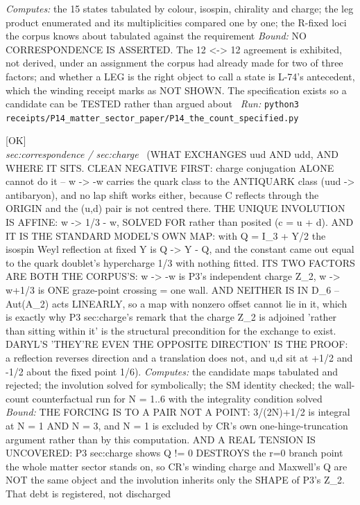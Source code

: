 \begin{description}
\emph{Computes:} the 15 states tabulated by colour, isospin, chirality and charge; the leg product enumerated and its multiplicities compared one by one; the R-fixed loci the corpus knows about tabulated against the requirement
 \emph{Bound:} NO CORRESPONDENCE IS ASSERTED. The 12 <-> 12 agreement is exhibited, not derived, under an assignment the corpus had already made for two of three factors; and whether a LEG is the right object to call a state is L-74's antecedent, which the winding receipt marks as NOT SHOWN. The specification exists so a candidate can be TESTED rather than argued about
\ \emph{Run:} \texttt{python3 receipts/P14\_matter\_sector\_paper/P14\_the\_count\_specified.py}
\item[\label{rcpt:P14_the_isospin_exchange}\texttt{P14\_the\_isospin\_exchange}]\hfill\textsf{[OK]}\\
\textit{sec:correspondence / sec:charge} \ (WHAT EXCHANGES uud AND udd, AND WHERE IT SITS. CLEAN NEGATIVE FIRST: charge conjugation ALONE cannot do it -- w -> -w carries the quark class to the ANTIQUARK class (uud -> antibaryon), and no lap shift works either, because C reflects through the ORIGIN and the (u,d) pair is not centred there. THE UNIQUE INVOLUTION IS AFFINE: w -> 1/3 - w, SOLVED FOR rather than posited (c = u + d). AND IT IS THE STANDARD MODEL'S OWN MAP: with Q = I\_3 + Y/2 the isospin Weyl reflection at fixed Y is Q -> Y - Q, and the constant came out equal to the quark doublet's hypercharge 1/3 with nothing fitted. ITS TWO FACTORS ARE BOTH THE CORPUS'S: w -> -w is P3's independent charge Z\_2, w -> w+1/3 is ONE graze-point crossing = one wall. AND NEITHER IS IN D\_6 -- Aut(A\_2) acts LINEARLY, so a map with nonzero offset cannot lie in it, which is exactly why P3 sec:charge's remark that the charge Z\_2 is adjoined 'rather than sitting within it' is the structural precondition for the exchange to exist. DARYL'S 'THEY'RE EVEN THE OPPOSITE DIRECTION' IS THE PROOF: a reflection reverses direction and a translation does not, and u,d sit at +1/2 and -1/2 about the fixed point 1/6). 
\emph{Computes:} the candidate maps tabulated and rejected; the involution solved for symbolically; the SM identity checked; the wall-count counterfactual run for N = 1..6 with the integrality condition solved
 \emph{Bound:} THE FORCING IS TO A PAIR NOT A POINT: 3/(2N)+1/2 is integral at N = 1 AND N = 3, and N = 1 is excluded by CR's own one-hinge-truncation argument rather than by this computation. AND A REAL TENSION IS UNCOVERED: P3 sec:charge shows Q != 0 DESTROYS the r=0 branch point the whole matter sector stands on, so CR's winding charge and Maxwell's Q are NOT the same object and the involution inherits only the SHAPE of P3's Z\_2. That debt is registered, not discharged

\end{description}
